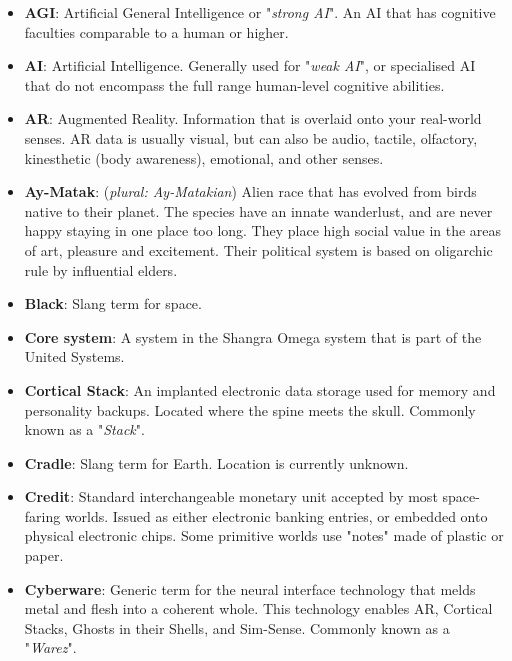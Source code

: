 \documentclass[10pt,twoside]{article}
\begin{document}
  \begin{multicols}{2}

  \begin{itemize}

    \item \textbf{AGI}: Artificial General Intelligence or "\textit{strong AI}". An AI that has cognitive faculties comparable to a human or higher.

    \item \textbf{AI}: Artificial Intelligence. Generally used for "\textit{weak AI}", or specialised AI that do not encompass the full range human-level cognitive abilities.

    \item \textbf{AR}: Augmented Reality. Information that is overlaid onto your real-world senses. AR data is usually visual, but can also be audio, tactile, olfactory, kinesthetic (body awareness), emotional, and other senses.

    \item \textbf{Ay-Matak}: (\textit{plural: Ay-Matakian}) Alien race that has evolved from birds native to their planet. The species have an innate wanderlust, and are never happy staying in one place too long. They place high social value in the areas of art, pleasure and excitement. Their political system is based on oligarchic rule by influential elders.

    \item \textbf{Black}: Slang term for space.

    \item \textbf{Core system}: A system in the Shangra Omega system that is part of the United Systems.

    \item \textbf{Cortical Stack}: An implanted electronic data storage used for memory and personality backups. Located where the spine meets the skull. Commonly known as a "\textit{Stack}".

    \item \textbf{Cradle}: Slang term for Earth. Location is currently unknown.

    \item \textbf{Credit}: Standard interchangeable monetary unit accepted by most space-faring worlds. Issued as either electronic banking entries, or embedded onto physical electronic chips. Some primitive worlds use "notes" made of plastic or paper.

    \item \textbf{Cyberware}: Generic term for the neural interface technology that melds metal and flesh into a coherent whole. This technology enables AR, Cortical Stacks, Ghosts in their Shells, and Sim-Sense. Commonly known as a "\textit{Warez}".


\end{itemize}
\end{multicols}
\end{document}
